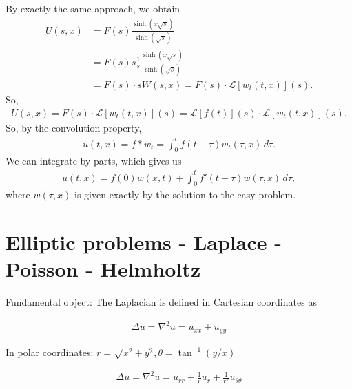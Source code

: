 \documentclass{book}
\theoremstyle{definition}
\newcommand{\lag}{\mathcal{L}}
\newcommand{\f}[2]{\frac{#1}{#2}}
\begin{document}
By exactly the same approach, we obtain
\begin{align*}
U(s,x) &= F(s)\f{\sinh(x\sqrt{s})}{\sinh(\sqrt{s})}\\
 &= F(s)s\f{1}{s}\f{\sinh(x\sqrt{s})}{\sinh(\sqrt{s})}\\
 &= F(s)\cdot sW(s,x) = F(s)\cdot \lag[w_t(t,x)](s).
\end{align*}
So,
\begin{align*}
U(s,x) = F(s) \cdot \lag[w_t(t,x)](s) = \lag[f(t)](s) \cdot \lag[w_t(t,x)](s).
\end{align*}
So, by the convolution property,
\begin{align*}
u(t,x) = f\ast w_t = \int^t_0 f(t-\tau)w_t(\tau,x)\,d\tau.
\end{align*}
We can integrate by parts, which gives us
\begin{align*}
u(t,x) = f(0)w(x,t) + \int^t_0 f'(t-\tau)w(\tau,x)\,d\tau,
\end{align*}
where $w(\tau,x)$ is given exactly by the solution to the easy problem.









\newpage





\chapter{Elliptic problems - Laplace - Poisson - Helmholtz}

Fundamental object: The Laplacian is defined in Cartesian coordinates as

\begin{align*}
\boxed{\Delta u = \nabla^2 u = u_{xx} + u_{yy}}
\end{align*}

In polar coordinates: $r = \sqrt{x^2 + y^2}, \theta = \tan^{-1}(y/x)$

\begin{align*}
\boxed{\Delta u = \nabla^2 u = u_{rr} + \f{1}{r}u_r + \f{1}{r^2}u_{\theta\theta}}
\end{align*}
\end{document}
